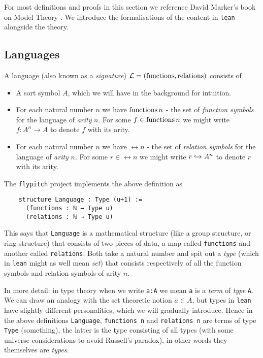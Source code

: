 For most definitions and proofs in this section we reference
David Marker's book on Model Theory \cite{marker}.
We introduce the formalisations of the content in \texttt{lean} alongside the theory.

\subsection{Languages}
\begin{dfn}[Language]
  A language (also known as a \textit{signature}) $\mathcal{L} = ( \operatorname{functions} , \operatorname{relations} )$ consists of

  \begin{itemize}
    \item A sort symbol $A$, which we will have in the background for intuition.
    \item For each natural number $n$ we have $\operatorname{functions} n$ -
          the set of \textit{function symbols} for the language of \textit{arity} $n$.
          For some $f \in \operatorname{functions} n$ we might write
          $f : A^{n} \to A$ to denote $f$ with its arity.
    \item For each natural number $n$ we have $\rel n$ -
          the set of \textit{relation symbols} for the language of \textit{arity} $n$.
          For some $r \in \rel n$ we might write
          $r \hookrightarrow A^{n}$ to denote $r$ with its arity.
  \end{itemize}

  The \texttt{flypitch} project implements the above definition as

  \begin{lstlisting}
    structure Language : Type (u+1) :=
      (functions : ℕ → Type u)
      (relations : ℕ → Type u)\end{lstlisting}

  This says that \texttt{Language} is a mathematical structure
  (like a group structure, or ring structure)
  that consists of two pieces of data,
  a map called \texttt{functions} and another called \texttt{relations}.
  Both take a natural number and spit out a \textit{type}
  (which in \texttt{lean} might as well mean \textit{set})
  that consists respectively of all the function symbols and relation symbols of arity $n$.

  In more detail: in type theory when we write \texttt{a:A} we mean \texttt{a} is a \textit{term}
  of \textit{type} \texttt{A}.
  We can draw an analogy with the set theoretic notion $a \in A$,
  but types in \texttt{lean} have slightly different
  personalities, which we will gradually introduce.
  Hence in the above definitions \texttt{Language}, \texttt{functions n} and \texttt{relations n}
  are terms of type \texttt{Type} (something),
  the latter is the type consisting of all types (with some universe considerations to avoid Russell's paradox),
  in other words they themselves are \textit{types}.


\end{dfn}
